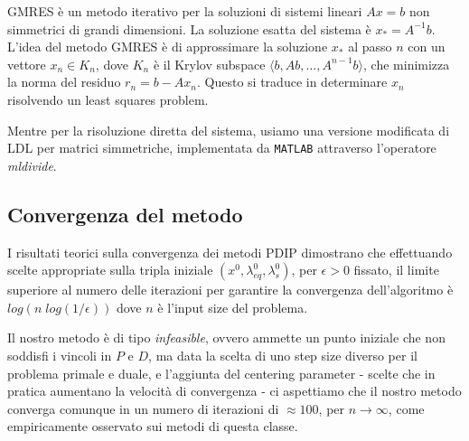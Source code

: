 GMRES è un metodo iterativo per la soluzioni di sistemi lineari $Ax=b$ non simmetrici di grandi dimensioni.
La soluzione esatta del sistema è $x_\ast = A^{-1}b$.
L'idea del metodo GMRES è di approssimare la soluzione $x_\ast$ al passo $n$ con un vettore $x_n \in K_n$, dove $K_n$ è il Krylov subspace $\langle b, Ab,\dots,A^{n-1}b\rangle$, che minimizza la norma del residuo $r_n = b - Ax_n$.
Questo si traduce in determinare $x_n$ risolvendo un least squares problem.

Mentre per la risoluzione diretta del sistema, usiamo una versione modificata di LDL per matrici simmetriche, implementata da \texttt{MATLAB} attraverso l'operatore \textit{mldivide}.


\subsection{Convergenza del metodo}\label{cap:Convergenza}

I risultati teorici sulla convergenza dei metodi PDIP \cite{Nocedal2006Numerical} dimostrano che effettuando scelte appropriate sulla tripla iniziale $(x^0, \lambda_{eq}^0, \lambda_s^0)$, per $\epsilon > 0$ fissato, il limite superiore al numero delle iterazioni per garantire la convergenza dell'algoritmo è $log(n\; log(1/\epsilon))$ dove $n$ è l'input size del problema.

Il nostro metodo è di tipo \textit{infeasible}, 
ovvero ammette un punto iniziale che non soddisfi i vincoli in $P$ e $D$, ma data la scelta di uno step size diverso per il problema primale e duale, e l'aggiunta del centering parameter - scelte che in pratica aumentano la velocità di convergenza - ci aspettiamo che il nostro metodo converga comunque in un numero di iterazioni di $\approx 100$, per $n \rightarrow \infty$, come empiricamente osservato sui metodi di questa classe.

